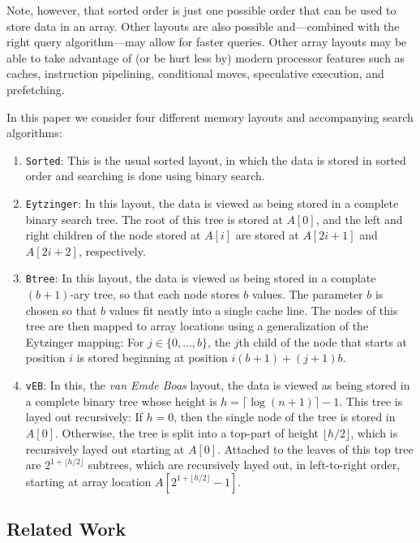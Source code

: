 \documentclass{patmorin}
\begin{document}
Note, however, that sorted order is just one possible order that can
be used to store data in an array. Other layouts are also possible
and---combined with the right query algorithm---may allow for faster
queries.  Other array layouts may be able to take advantage of (or be
hurt less by) modern processor features such as caches, instruction
pipelining, conditional moves, speculative execution, and prefetching.

In this paper we consider four different memory layouts and accompanying search algorithms:

\begin{enumerate}
\item \texttt{Sorted}:  This is the usual sorted layout, in which the data is stored in sorted order and searching is done using binary search.

\item \texttt{Eytzinger}: In this layout, the data is viewed as being
stored in a complete binary search tree.  The root of this tree is stored
at $A[0]$, and the left and right children of the node stored at $A[i]$
are stored at $A[2i+1]$ and $A[2i+2]$, respectively.

\item \texttt{Btree}: In this layout, the data is viewed as being stored
in a complate $(b+1)$-ary tree, so that each node stores $b$ values.
The parameter $b$ is chosen so that $b$ values fit neatly into a
single cache line. The nodes of this tree are then mapped to array
locations using a generalization of the Eytzinger mapping:  For $j\in
\{0,\ldots,b\}$, the $j$th child of the node that starts at position $i$
is stored beginning at position $i(b+1)+(j+1)b$.

\item \texttt{vEB}: In this, the \emph{van Emde Boas} layout, the data
is viewed as being stored in a complete binary tree whose height is
$h=\lceil\log (n+1)\rceil -1$. This tree is layed out recursively:  If $h=0$,
then the single node of the tree is stored in $A[0]$.  Otherwise, the tree is split into a top-part of height $\lfloor h/2\rfloor$, which is recursively layed out starting at $A[0]$.  Attached to the leaves of this top tree are $2^{1+\lfloor{h/2\rfloor}}$ subtrees, which are recursively layed out, in left-to-right order, starting at array location $A[2^{1+\lfloor{h/2\rfloor}}-1]$.
\end{enumerate}


\subsection{Related Work}
\end{document}
